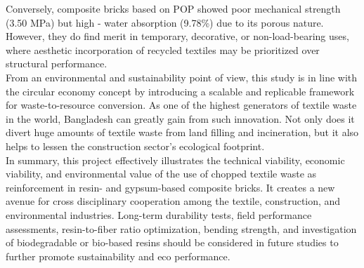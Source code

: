 \noindent Conversely, composite bricks based on POP showed poor mechanical strength (3.50 MPa) but high - water absorption (9.78\%) due to its porous nature. However, they do find merit in temporary, decorative, or non-load-bearing uses, where aesthetic incorporation of recycled textiles may be prioritized over structural performance. \\

\noindent From an environmental and sustainability point of view, this study is in line with the circular economy concept by introducing a scalable and replicable framework for waste-to-resource conversion. As one of the highest generators of textile waste in the world, Bangladesh can greatly gain from such innovation. Not only does it divert huge amounts of textile waste from land filling and incineration, but it also helps to lessen the construction sector's ecological footprint. \\

\noindent In summary, this project effectively illustrates the technical viability, economic viability, and environmental value of the use of chopped textile waste as reinforcement in resin- and gypsum-based composite bricks. It creates a new avenue for cross disciplinary cooperation among the textile, construction, and environmental industries. Long-term durability tests, field performance assessments, resin-to-fiber ratio optimization, bending strength, and investigation of biodegradable or bio-based resins should be considered in future studies to further promote sustainability and eco performance.